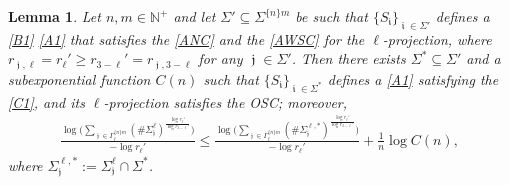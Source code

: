 \documentclass[a4paper, 11pt]{article}
\DeclareMathOperator{\iii}{\mathfrak{i}}
\DeclareMathOperator{\jjj}{\mathfrak{j}}
\numberwithin{equation}{section}
\theoremstyle{plain}
\newtheorem{lemma}[theorem]{Lemma}
\theoremstyle{remark}
\theoremstyle{definition}
\begin{document}
\begin{lemma} \label{lemma:hdimroscsubsystem}
Let $n,m \in \mathbb{N}^+$ and let $\Sigma' \subseteq \Sigma^{\{n\}m}$ be such that $\{S_{\iii}\}_{\iii \in \Sigma'}$ defines a \ref{B1} \ref{A1} that satisfies the \ref{ANC} and the \ref{AWSC} for the $\ell$-projection, where $r_{\jjj,\ell} = r_\ell' \geq r_{3-\ell}' = r_{\jjj,3-\ell}$ for any $\jjj \in \Sigma'$. Then there exists $\Sigma^* \subseteq \Sigma'$ and a subexponential function $C(n)$ such that $\{S_{\iii}\}_{\iii \in \Sigma^*}$ defines a \ref{A1} satisfying the \ref{C1}, and its $\ell$-projection satisfies the OSC; moreover,
\begin{align*}
\frac{\log \bigg(\sum\limits_{\jjj\in\Gamma_{\ell}^{\{n\}m}}(\#\Sigma_{\jjj}^\ell )^{\frac{\log r_\ell'}{\log r_{3-\ell}'}}\bigg)}{-\log r_\ell'} 
\leq 
\frac{\log \bigg(\sum\limits_{\jjj\in\Gamma_{\ell}^{\{n\}m}} (\#\Sigma_{\jjj}^{\ell,*} )^{\frac{\log r_\ell'}{\log r_{3-\ell}'}}\bigg)}{-\log r_\ell'} 
+ \frac{1}{n}\log C(n),
\end{align*}
where $\Sigma_{\jjj}^{\ell,*} := \Sigma_{\jjj}^{\ell} \cap \Sigma^*$.
\end{lemma}
\end{document}
